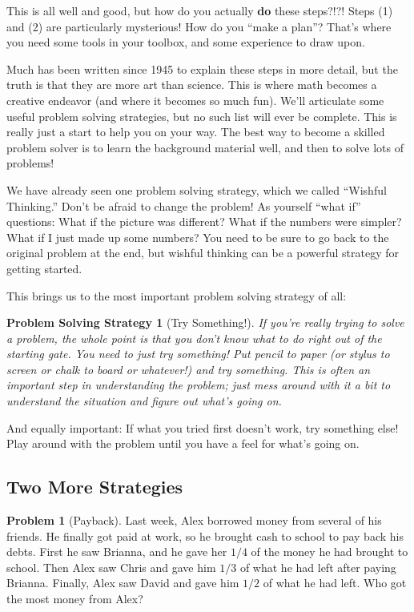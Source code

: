 \documentclass[10pt, reqno]{amsart}
\newtheorem{ps}{Problem Solving Strategy}
\theoremstyle{remark}
\theoremstyle{definition}
\newtheorem{problem}{Problem}
\numberwithin{equation}{section}  %
\begin{document}
This is all well and good, but how do you actually {\bf do} these steps?!?!  Steps (1) and (2) are particularly mysterious!  How do you ``make a plan''?  That's where you need some tools in your toolbox, and some experience to draw upon.  

Much has been written since 1945 to explain these steps in more detail, but the truth is that they are more art than science.  This is where math becomes a creative endeavor (and where it becomes so much fun).  We'll articulate some useful problem solving strategies, but no such list will ever be complete.  This is really just a start to help you on your way.  The best way to become a skilled problem solver is to learn the background material well, and then to solve lots of problems!

We have already seen one problem solving strategy, which we called ``Wishful Thinking.''  Don't be afraid to change the problem!  As yourself ``what if'' questions: What if the picture was different?  What if the numbers were simpler?  What if I just made up some numbers?  You need to be sure to go back to the original problem at the end, but wishful thinking can be a powerful strategy for getting started.

This brings us to the most important problem solving strategy of all:
\begin{ps}[Try Something!]
If you're really trying to solve a problem, the whole point is that you don't know what to do right out of the starting gate.  You need to just try something!  Put pencil to paper (or stylus to screen or chalk to board or whatever!) and try something.  This is often an important step in understanding the problem; just mess around with it a bit to understand the situation and figure out what's going on.
\end{ps}

And equally important: If what you tried first doesn't work, try something else!  Play around with the problem until you have a feel for what's going on.



\subsection{Two More Strategies}
\begin{problem}[Payback]
Last week, Alex borrowed money from several of his friends.  He finally got paid at work, so he brought cash to school to pay back his debts.  First he saw Brianna, and he gave her $1/4$ of the money he had brought to school.  Then Alex saw Chris and gave him $1/3$ of what he had left after paying Brianna.  Finally, Alex saw David and gave him $1/2$ of what he had left.  Who got the most money from Alex?
\end{problem}
\end{document}
